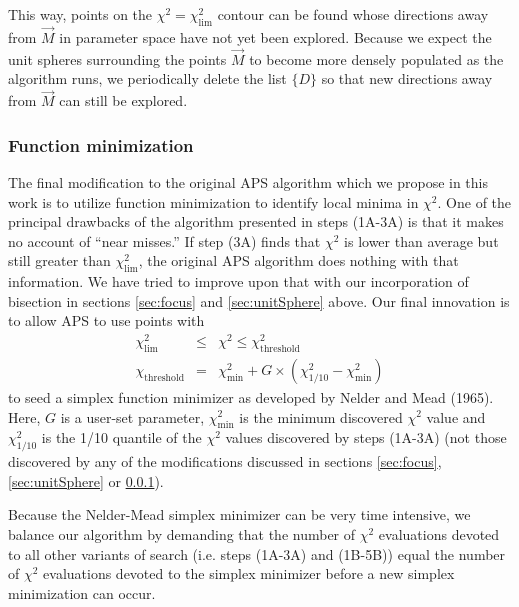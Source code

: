 \documentclass[useAMS,usenatbib]{aastex}
\begin{document}
This way, points on the $\chi^2=\chi^2_\text{lim}$ contour can be found whose
directions away from $\vec{M}$ in parameter space have not yet been explored.
Because we expect the unit spheres surrounding the points $\vec{M}$ to become more densely
populated as the algorithm runs, we periodically delete the list $\{D\}$ so that
new directions away from $\vec{M}$ can still be explored.

\subsubsection{Function minimization}
\label{sec:simplex}

The final modification to the original APS algorithm which we propose in this
work is to utilize function minimization to identify local minima in $\chi^2$.
One of the principal drawbacks of the algorithm presented in steps (1A-3A) is
that it makes no account of ``near misses.''  If step (3A) finds that $\chi^2$
is lower than average but still greater than $\chi^2_\text{lim}$, the original
APS algorithm does nothing with that information.  We have tried to improve upon
that with our incorporation of bisection in sections \ref{sec:focus} and
\ref{sec:unitSphere} above.  Our final innovation is to allow APS to use points
with 
\begin{eqnarray}
\chi^2_\text{lim}&\le&\chi^2\le\chi^2_\text{threshold}\label{eqn:simplexCriterion}\\
\chi_\text{threshold}&=&\chi^2_\text{min}+G\times(\chi^2_{1/10}-\chi^2_\text{min})
\label{eqn:threshold}
\end{eqnarray}
to seed a simplex function minimizer as developed by Nelder and Mead (1965).
Here, $G$ is a user-set parameter, $\chi^2_\text{min}$ is the minimum discovered
$\chi^2$ value and $\chi^2_{1/10}$ is the 1/10 quantile of the $\chi^2$ values
discovered by steps (1A-3A) (not those discovered by any of the modifications
discussed in sections \ref{sec:focus}, \ref{sec:unitSphere} or
\ref{sec:simplex}).

Because the Nelder-Mead simplex minimizer can be very time intensive, we balance our
algorithm by demanding that the number of $\chi^2$ evaluations devoted to all
other variants of search (i.e. steps (1A-3A) and (1B-5B)) equal the number of
$\chi^2$ evaluations devoted to the simplex minimizer before a new simplex
minimization can occur.
\end{document}
